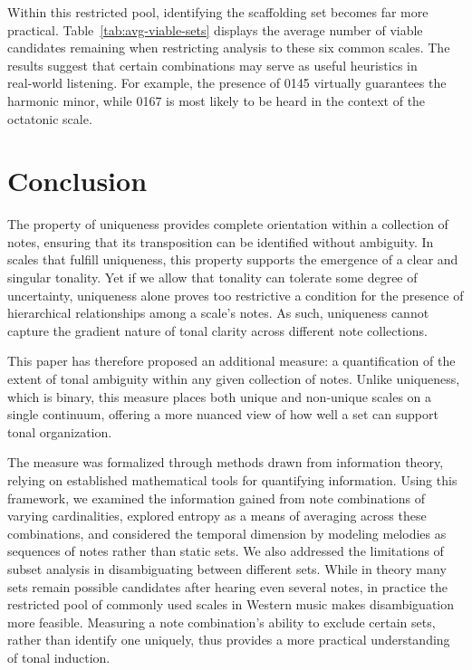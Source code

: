 \documentclass[10pt,twocolumn]{article}
\numberwithin{equation}{section} %
\begin{document}
    Within this restricted pool, identifying the scaffolding set becomes far more practical.
    Table~\ref{tab:avg-viable-sets} displays the average number of viable candidates remaining when restricting analysis to these six common scales.
    The results suggest that certain combinations may serve as useful heuristics in real‑world listening.
    For example, the presence of 0145 virtually guarantees the harmonic minor, while 0167 is most likely to be heard in the context of the octatonic scale.

    

    \section{Conclusion}

    The property of uniqueness provides complete orientation within a collection of notes, ensuring that its transposition can be identified without ambiguity.
    In scales that fulfill uniqueness, this property supports the emergence of a clear and singular tonality.
    Yet if we allow that tonality can tolerate some degree of uncertainty, uniqueness alone proves too restrictive a condition for the presence of hierarchical relationships among a scale's notes.
    As such, uniqueness cannot capture the gradient nature of tonal clarity across different note collections.

    This paper has therefore proposed an additional measure: a quantification of the extent of tonal ambiguity within any given collection of notes.
    Unlike uniqueness, which is binary, this measure places both unique and non‑unique scales on a single continuum, offering a more nuanced view of how well a set can support tonal organization.

    The measure was formalized through methods drawn from information theory, relying on established mathematical tools for quantifying information.
    Using this framework, we examined the information gained from note combinations of varying cardinalities, explored entropy as a means of averaging across these combinations, and considered the temporal dimension by modeling melodies as sequences of notes rather than static sets.
    We also addressed the limitations of subset analysis in disambiguating between different sets.
    While in theory many sets remain possible candidates after hearing even several notes, in practice the restricted pool of commonly used scales in Western music makes disambiguation more feasible.
    Measuring a note combination's ability to exclude certain sets, rather than identify one uniquely, thus provides a more practical understanding of tonal induction.
\end{document}
